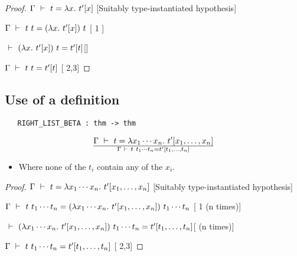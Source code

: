 \vspace{12pt plus2pt minus1pt}

\begin{proof}
\item $\Gamma\ \vdash\  t = \lambda x.\  t'[x]$\hfill
[Suitably type-instantiated hypothesis]
\item $\Gamma\ \vdash\  t\ t =
(\lambda x.\ t'[x])\ t$\hfill
[ 1 ]
\item $\ \vdash\ (\lambda x.\ t'[x])\ t =
t'[t]$\hfill []
\item $\Gamma\ \vdash\  t\ t = t'[t]$\hfill
[ 2,3]
\end{proof}


\subsection{Use of a definition}

\begin{boxed}
\begin{verbatim}
   RIGHT_LIST_BETA : thm -> thm
\end{verbatim}\end{boxed}

\vspace{12pt plus2pt minus1pt}

$$\Gamma\ \vdash\  t = \lambda x_1\cdots x_n.\ t'[x_1,\ldots,x_n]
\over \Gamma\ \vdash\  t\ t_1\cdots t_n = t'[t_1,\ldots,t_n]$$
\begin{itemize}
\item Where none of the $t_i$ contain any of the $x_i$.
\end{itemize}

\vspace{12pt plus2pt minus1pt}

\begin{proof}
\item $\Gamma\ \vdash\  t = \lambda x_1\cdots x_n.\  t'[x_1,\ldots,x_n]$\hfill
[Suitably type-instantiated hypothesis]
\item $\Gamma\ \vdash\  t\ t_1\cdots t_n =
(\lambda x_1\cdots x_n.\ t'[x_1,\ldots,x_n])\ t_1\cdots t_n$\hfill
[ 1 (n times)]
\item $\ \vdash\ (\lambda x_1\cdots x_n.\ t'[x_1,\ldots,x_n])\ t_1\cdots t_n =
t'[t_1,\ldots,t_n]$\hfill [ (n times)]
\item $\Gamma\ \vdash\  t\ t_1\cdots t_n = t'[t_1,\ldots,t_n]$\hfill
[ 2,3]
\end{proof}






